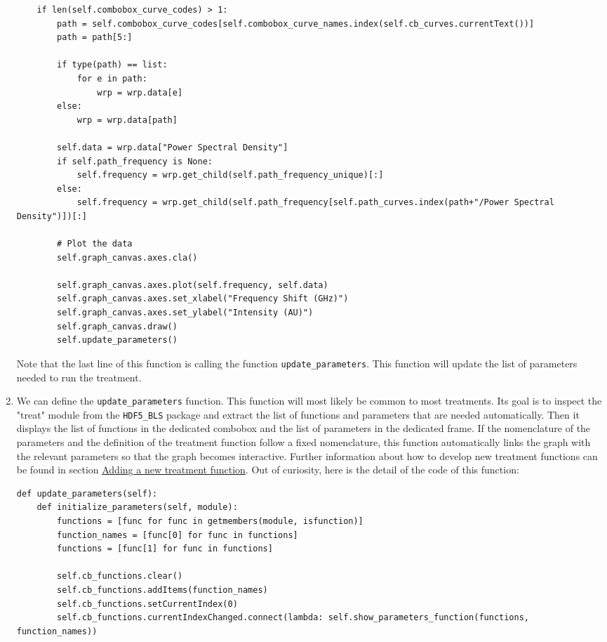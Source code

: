 \documentclass[a4paper,12pt]{article}
\begin{document}
\begin{enumerate}
\begin{lstlisting}
    if len(self.combobox_curve_codes) > 1:
        path = self.combobox_curve_codes[self.combobox_curve_names.index(self.cb_curves.currentText())]
        path = path[5:]

        if type(path) == list:
            for e in path:
                wrp = wrp.data[e]
        else:
            wrp = wrp.data[path]
        
        self.data = wrp.data["Power Spectral Density"]
        if self.path_frequency is None:
            self.frequency = wrp.get_child(self.path_frequency_unique)[:]
        else:
            self.frequency = wrp.get_child(self.path_frequency[self.path_curves.index(path+"/Power Spectral Density")])[:]
        
        # Plot the data
        self.graph_canvas.axes.cla()

        self.graph_canvas.axes.plot(self.frequency, self.data)
        self.graph_canvas.axes.set_xlabel("Frequency Shift (GHz)")
        self.graph_canvas.axes.set_ylabel("Intensity (AU)")
        self.graph_canvas.draw()
        self.update_parameters()
\end{lstlisting}
        Note that the last line of this function is calling the function \texttt{update\_parameters}. This function will update the list of parameters needed to run the treatment. 
        \item We can define the \texttt{update\_parameters} function. This function will most likely be common to most treatments. Its goal is to inspect the "treat" module from the \texttt{HDF5\_BLS} package and extract the list of functions and parameters that are needed automatically. Then it displays the list of functions in the dedicated combobox and the list of parameters in the dedicated frame. If the nomenclature of the parameters and the definition of the treatment function follow a fixed nomenclature, this function automatically links the graph with the relevant parameters so that the graph becomes interactive. Further information about how to develop new treatment functions can be found in section \hyperref[subsec:treatment.new]{Adding a new treatment function}. Out of curiosity, here is the detail of the code of this function:
\begin{lstlisting}
def update_parameters(self):
    def initialize_parameters(self, module):
        functions = [func for func in getmembers(module, isfunction)]
        function_names = [func[0] for func in functions]
        functions = [func[1] for func in functions]

        self.cb_functions.clear()
        self.cb_functions.addItems(function_names)
        self.cb_functions.setCurrentIndex(0)
        self.cb_functions.currentIndexChanged.connect(lambda: self.show_parameters_function(functions, function_names))


\end{lstlisting}
\end{enumerate}
\end{document}
